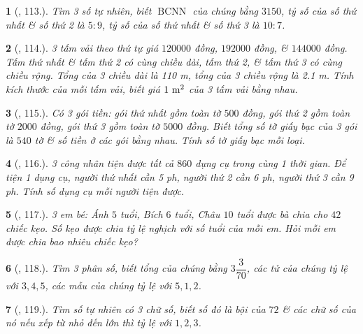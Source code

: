 \documentclass{article}
\newtheorem{baitoan}{}
\begin{document}
\begin{baitoan}[\cite{Binh_Toan_7_tap_1}, 113.]
	Tìm 3 số tự nhiên, biết $\operatorname{BCNN}$ của chúng bằng $3150$, tỷ số của số thứ nhất \& số thứ 2 là $5:9$, tỷ số của số thứ nhất \& số thứ 3 là $10:7$.
\end{baitoan}

\begin{baitoan}[\cite{Binh_Toan_7_tap_1}, 114.]
	3 tấm vải theo thứ tự giá $120000$ đồng, $192000$ đồng, \& $144000$ đồng. Tấm thứ nhất \& tấm thứ 2 có cùng chiều dài, tấm thứ 2, \& tấm thứ 3 có cùng chiều rộng. Tổng của 3 chiều dài là {\rm110 m}, tổng của 3 chiều rộng là {\rm2.1 m}. Tính kích thước của mỗi tấm vải, biết giá $\rm1\ m^2$ của 3 tấm vải bằng nhau.
\end{baitoan}

\begin{baitoan}[\cite{Binh_Toan_7_tap_1}, 115.]
	Có 3 gói tiền: gói thứ nhất gồm toàn tờ $500$ đồng, gói thứ 2 gồm toàn tờ $2000$ đồng, gói thứ 3 gồm toàn tờ $5000$ đồng. Biết tổng số tờ giấy bạc của 3 gói là $540$ tờ \& số tiền ở các gói bằng nhau. Tính số tờ giấy bạc mỗi loại.
\end{baitoan}

\begin{baitoan}[\cite{Binh_Toan_7_tap_1}, 116.]
	3 công nhân tiện được tất cả $860$ dụng cụ trong cùng 1 thời gian. Để tiện 1 dụng cụ, người thứ nhất cần {\rm5 ph}, người thứ 2 cần {\rm6 ph}, người thứ 3 cần {\rm9 ph}. Tính số dụng cụ mỗi người tiện được.
\end{baitoan}

\begin{baitoan}[\cite{Binh_Toan_7_tap_1}, 117.]
	3 em bé: Ánh $5$ tuổi, Bích $6$ tuổi, Châu $10$ tuổi được bà chia cho $42$ chiếc kẹo. Số kẹo được chia tỷ lệ nghịch với số tuổi của mỗi em. Hỏi mỗi em được chia bao nhiêu chiếc kẹo?
\end{baitoan}

\begin{baitoan}[\cite{Binh_Toan_7_tap_1}, 118.]
	Tìm 3 phân số, biết tổng của chúng bằng $3\dfrac{3}{70}$, các tử của chúng tỷ lệ với $3,4,5$, các mẫu của chúng tỷ lệ với $5,1,2$.
\end{baitoan}

\begin{baitoan}[\cite{Binh_Toan_7_tap_1}, 119.]
	Tìm số tự nhiên có 3 chữ số, biết số đó là bội của $72$ \& các chữ số của nó nếu xếp từ nhỏ đến lớn thì tỷ lệ với $1,2,3$.
\end{baitoan}
\end{document}
